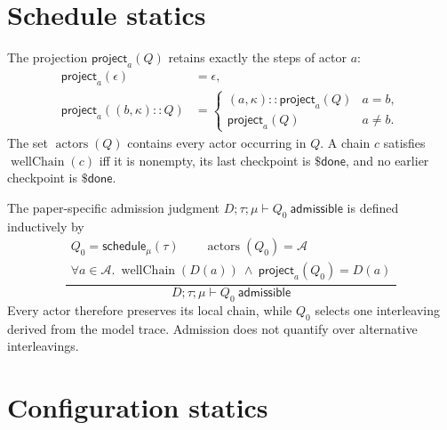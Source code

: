 \documentclass{article}
\newcommand{\CPDone}{\mathsf{\$done}}
\newcommand{\project}{\mathsf{project}}
\newcommand{\ScheduleOf}{\mathsf{schedule}}
\begin{document}
\section{Schedule statics}

The projection $\project_a(Q)$ retains exactly the steps of actor $a$:
\[
\begin{aligned}
  \project_a(\epsilon)&=\epsilon,\\
  \project_a((b,\kappa)::Q)&=
  \begin{cases}
    (a,\kappa)::\project_a(Q)&a=b,\\
    \project_a(Q)&a\ne b.
  \end{cases}
\end{aligned}
\]
The set $\operatorname{actors}(Q)$ contains every actor occurring in $Q$. A
chain $c$ satisfies $\operatorname{wellChain}(c)$ iff it is nonempty, its last
checkpoint is $\CPDone$, and no earlier checkpoint is $\CPDone$.

The paper-specific admission judgment
$D;\tau;\mu\vdash Q_0\ \mathsf{admissible}$ is defined inductively by
\[
\frac{
  \begin{array}{c}
    Q_0=\ScheduleOf_\mu(\tau)\qquad
    \operatorname{actors}(Q_0)=\mathcal A\\
    \forall a\in\mathcal A.\
      \operatorname{wellChain}(D(a))\ \land\
      \project_a(Q_0)=D(a)
  \end{array}
}{
  D;\tau;\mu\vdash Q_0\ \mathsf{admissible}
}
\]
Every actor therefore preserves its local chain, while $Q_0$ selects one
interleaving derived from the model trace. Admission does not quantify over
alternative interleavings.

\section{Configuration statics}
\label{sec:configuration-statics}
\end{document}
